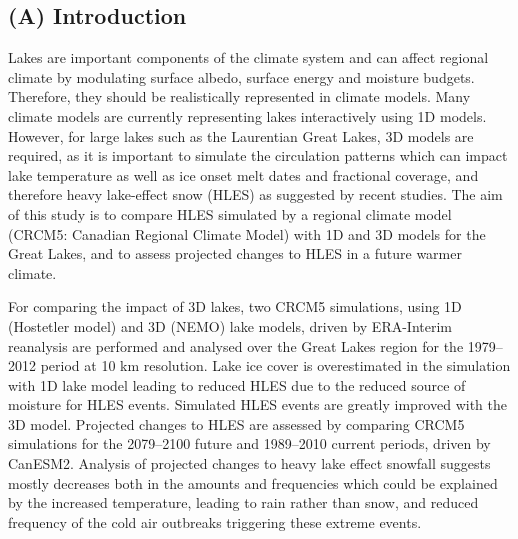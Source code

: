 \documentclass[a0b,landscape]{a0poster}
\begin{document}
\begin{multicols*}{4} %



\section*{(A) Introduction}
Lakes are important components of the climate system and can affect regional
climate by modulating surface albedo, surface energy and moisture budgets.
Therefore, they should be realistically represented in climate models. Many
climate models are currently representing lakes interactively using 1D models.
However, for large lakes such as the Laurentian Great Lakes, 3D models are
required, as it is important to simulate the circulation patterns which can
impact lake temperature as well as ice onset melt dates and fractional coverage,
and therefore heavy lake-effect snow (HLES) as suggested by recent studies. The
aim of this study is to compare HLES simulated by a regional climate model
(CRCM5: Canadian Regional Climate Model) with 1D and 3D models for the Great
Lakes, and to assess projected changes to HLES in a future warmer climate.

For comparing the impact of 3D lakes, two CRCM5 simulations, using 1D (Hostetler
model) and 3D (NEMO) lake models, driven by ERA-Interim reanalysis are performed
and analysed over the Great Lakes region for the 1979–2012 period at 10 km
resolution. Lake ice cover is overestimated in the simulation with 1D lake model
leading to reduced HLES due to the reduced source of moisture for HLES events.
Simulated HLES events are greatly improved with the 3D model. Projected changes
to HLES are assessed by comparing CRCM5 simulations for the 2079–2100 future and
1989–2010 current periods, driven by CanESM2. Analysis of projected changes to
heavy lake effect snowfall suggests mostly decreases both in the amounts and
frequencies which could be explained by the increased temperature, leading to
rain rather than snow, and reduced frequency of the cold air outbreaks
triggering these extreme events.



\end{multicols*}
\end{document}
